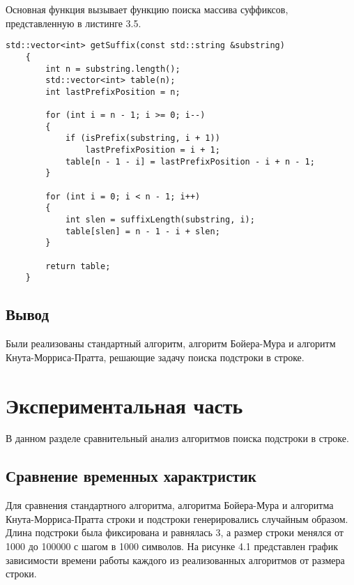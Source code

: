 \documentclass[a4paper,12pt]{report}
\begin{document}
Основная функция вызывает функцию поиска массива суффиксов, представленную в листинге 3.5.

\begin{lstlisting}[caption=Функция вычисления массива суффиксов]
    std::vector<int> getSuffix(const std::string &substring)
    {
        int n = substring.length();
        std::vector<int> table(n);
        int lastPrefixPosition = n;
    
        for (int i = n - 1; i >= 0; i--)
        {
            if (isPrefix(substring, i + 1))
                lastPrefixPosition = i + 1;
            table[n - 1 - i] = lastPrefixPosition - i + n - 1;
        }
    
        for (int i = 0; i < n - 1; i++)
        {
            int slen = suffixLength(substring, i);
            table[slen] = n - 1 - i + slen;
        }
    
        return table;
    }
\end{lstlisting}

\section{Вывод}
\hspace{0.6cm}Были реализованы стандартный алгоритм, алгоритм Бойера-Мура и алгоритм Кнута-Морриса-Пратта, решающие задачу поиска подстроки в строке.

\chapter{Экспериментальная часть}
\hspace{0.6cm}В данном разделе сравнительный анализ алгоритмов поиска подстроки в строке.

\section{Сравнение временных характристик}
\hspace{0.6cm}Для сравнения стандартного алгоритма, алгоритма Бойера-Мура и алгоритма Кнута-Морриса-Пратта строки и подстроки генерировались случайным образом. Длина подстроки была фиксирована и равнялась 3, а размер строки менялся от 1000 до 100000 с шагом в 1000 символов. На рисунке 4.1 представлен график зависимости времени работы каждого из реализованных алгоритмов от размера строки.
\end{document}
